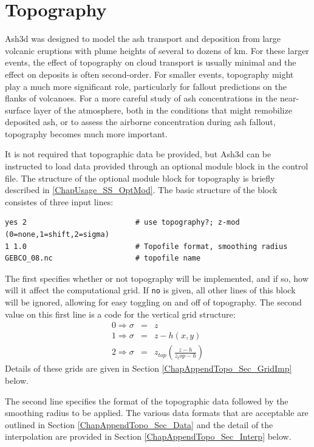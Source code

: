 \chapter{Topography}\label{ChapAppendTopo}
Ash3d was designed to model the ash transport and deposition from large volcanic
eruptions with plume heights of several to dozens of km. For these larger
events, the effect of topography on cloud transport is usually minimal
and the effect on deposits is often second-order. For smaller events,
topography might play a much more significant role, particularly for 
fallout predictions on the flanks of volcanoes. For a more careful
study of ash concentrations in the near-surface layer of the atmosphere,
both in the conditions that might remobilize deposited ash, or to
assess the airborne concentration during ash fallout, topography
becomes much more important.

It is not required that topographic data be provided, but Ash3d can
be instructed to load data provided through an optional module block
in the control file. The structure of the optional module block for
topography is briefly described in \ref{ChapUsage_SS_OptMod}. The basic
structure of the block consistes of three input lines:
\small
\begin{verbatim}
yes 2                         # use topography?; z-mod (0=none,1=shift,2=sigma)
1 1.0                         # Topofile format, smoothing radius
GEBCO_08.nc                   # topofile name
\end{verbatim}
\normalsize
The first specifies whether or not topography will be implemented, and if
so, how will it affect the computational grid. If \texttt{no} is
given, all other lines of this block will be ignored, allowing for
easy toggling on and off of topography. The second value on this first line is
a code for the vertical grid structure:
\begin{eqnarray*}
0 \Rightarrow  \sigma &=& z \\
1 \Rightarrow  \sigma &=& z - h(x,y) \\
2 \Rightarrow  \sigma &=& z_{top} \left( \frac{z-h}{z_top - h} \right)
\end{eqnarray*}
Details of these grids are given in Section \ref{ChapAppendTopo_Sec_GridImp} below.

The second line specifies the format of the topographic data followed by
the smoothing radius to be applied. The various data formats that are acceptable
are outlined in Section \ref{ChapAppendTopo_Sec_Data} and the detail of the
interpolation are provided in Section \ref{ChapAppendTopo_Sec_Interp} below.

